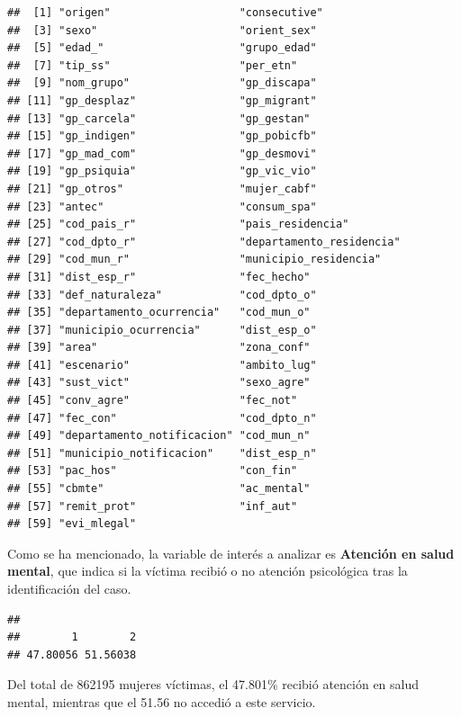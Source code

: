 \documentclass[
]{article}
\begin{document}
\begin{verbatim}
##  [1] "origen"                    "consecutive"              
##  [3] "sexo"                      "orient_sex"               
##  [5] "edad_"                     "grupo_edad"               
##  [7] "tip_ss"                    "per_etn"                  
##  [9] "nom_grupo"                 "gp_discapa"               
## [11] "gp_desplaz"                "gp_migrant"               
## [13] "gp_carcela"                "gp_gestan"                
## [15] "gp_indigen"                "gp_pobicfb"               
## [17] "gp_mad_com"                "gp_desmovi"               
## [19] "gp_psiquia"                "gp_vic_vio"               
## [21] "gp_otros"                  "mujer_cabf"               
## [23] "antec"                     "consum_spa"               
## [25] "cod_pais_r"                "pais_residencia"          
## [27] "cod_dpto_r"                "departamento_residencia"  
## [29] "cod_mun_r"                 "municipio_residencia"     
## [31] "dist_esp_r"                "fec_hecho"                
## [33] "def_naturaleza"            "cod_dpto_o"               
## [35] "departamento_ocurrencia"   "cod_mun_o"                
## [37] "municipio_ocurrencia"      "dist_esp_o"               
## [39] "area"                      "zona_conf"                
## [41] "escenario"                 "ambito_lug"               
## [43] "sust_vict"                 "sexo_agre"                
## [45] "conv_agre"                 "fec_not"                  
## [47] "fec_con"                   "cod_dpto_n"               
## [49] "departamento_notificacion" "cod_mun_n"                
## [51] "municipio_notificacion"    "dist_esp_n"               
## [53] "pac_hos"                   "con_fin"                  
## [55] "cbmte"                     "ac_mental"                
## [57] "remit_prot"                "inf_aut"                  
## [59] "evi_mlegal"
\end{verbatim}

Como se ha mencionado, la variable de interés a analizar es
\textbf{Atención en salud mental}, que indica si la víctima recibió o no
atención psicológica tras la identificación del caso.

\begin{verbatim}
## 
##        1        2 
## 47.80056 51.56038
\end{verbatim}

Del total de 862195 mujeres víctimas, el 47.801\% recibió atención en
salud mental, mientras que el 51.56 no accedió a este servicio.
\end{document}
